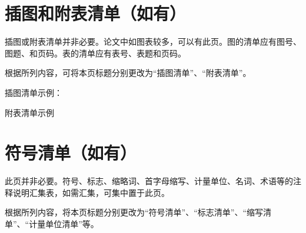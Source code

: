 \chapter*{插图和附表清单（如有）}

插图或附表清单并非必要。论文中如图表较多，可以有此页。图的清单应有图号、图题、和页码。表的清单应有表号、表题和页码。

根据所列内容，可将本页标题分别更改为“插图清单”、“附表清单”。

插图清单示例：

\listoffigures

附表清单示例

\listoftables

\chapter*{符号清单（如有）}

此页并非必要。符号、标志、缩略词、首字母缩写、计量单位、名词、术语等的注释说明汇集表，如需汇集，可集中置于此页。

根据所列内容，将本页标题分别更改为“符号清单”、“标志清单”、“缩写清单”、“计量单位清单”等。 

